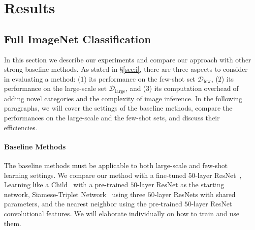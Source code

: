 \section{Results}\label{sec:e}
\subsection{Full ImageNet Classification}
In this section we describe our experiments and compare our approach with other strong baseline methods.  As stated in \S\ref{sec:i}, there are three aspects to consider in evaluating a method: (1) its performance on the few-shot set $\mathcal{D}_{\text{few}}$, (2) its performance on the large-scale set $\mathcal{D}_{\text{large}}$, and (3) its computation overhead of adding novel categories and the complexity of image inference. In the following paragraphs, we will cover the settings of the baseline methods, compare the performances on the large-scale and the few-shot sets, and discuss their efficiencies.

\paragraph{Baseline Methods}
The baseline methods must be applicable to both large-scale and few-shot learning settings. We compare our method with a fine-tuned $50$-layer ResNet~\cite{DBLP:conf/cvpr/HeZRS16}, Learning like a Child~\cite{mao2015learning} with a pre-trained $50$-layer ResNet as the starting network, Siamese-Triplet Network~\cite{siamese,lin2017transfer} using three $50$-layer ResNets with shared parameters, and the nearest neighbor using the pre-trained $50$-layer ResNet convolutional features. We will elaborate individually on how to train and use them.

